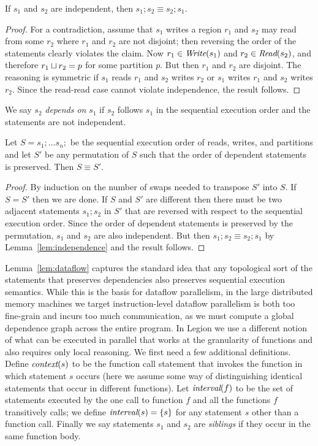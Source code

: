 \begin{lemma}
\rm
\label{lem:independence}
If $s_1$ and $s_2$ are independent, then $s_1; s_2 \equiv s_2; s_1$.
\end{lemma}
\begin{proof}
For a contradiction, assume that $s_1$ writes a region $r_1$ and $s_2$ may read from some $r_2$ where $r_1$ and $r_2$
are not disjoint; then reversing the order of the statements clearly violates the claim.  Now $r_1 \in \mbox{\em Write}(s_1)$
and $r_2 \in \mbox{\em Read}(s_2)$, and therefore $r_1 \sqcup r_2 = p$ for some partition $p$.  But then $r_1$ and $r_2$ are disjoint.
The reasoning is symmetric if $s_1$ reads $r_1$ and $s_2$ writes $r_2$ or $s_1$ writes $r_1$ and $s_2$ writes $r_2$.
Since the read-read case cannot violate independence, the result follows.
\end{proof}
We say $s_2$ {\em depends on} $s_1$ if $s_2$ follows $s_1$ in the sequential execution order and the statements are not independent.
\begin{lemma}
\rm
\label{lem:dataflow}
Let $S = s_1; \ldots s_n;$ be the sequential execution order of reads, writes, and partitions and let $S'$ be any permutation of $S$ such that the order of dependent statements is preserved.  Then $S \equiv S'$.
\end{lemma}
\begin{proof}
By induction on the number of swaps needed to transpose $S'$ into $S$.
If $S = S'$ then we are done.  If $S$ and $S'$ are different then
there must be two adjacent statements $s_1; s_2$ in $S'$ that are
reversed with respect to the sequential execution order.  Since the order of
dependent statements is preserved by the permutation, $s_1$ and $s_2$ are also independent.
But then $s_1; s_2 \equiv s_2; s_1$ by Lemma~\ref{lem:independence} and the result follows.
\end{proof}
Lemma~\ref{lem:dataflow} captures the standard idea that any
topological sort of the statements that preserves dependencies also
preserves sequential execution semantics.  While this is the basis for
dataflow parallelism, in the large distributed memory machines we
target instruction-level dataflow parallelism is both too fine-grain
and incurs too much communication, as we must compute a global
dependence graph across the entire program.  In Legion we use a
different notion of what can be executed in parallel that works at the
granularity of functions and also requires only local reasoning.  We
first need a few additional definitions.  Define $\mbox{\em context}(s)$ to be
the function call statement that invokes the function in which
statement $s$ occurs (here we assume some way of distinguishing
identical statements that occur in different functions).  Let
$\mbox{\em interval}(f)$ to be the set of statements executed by the one call to
function $f$ and all the functions $f$ transitively calls; we define
$\mbox{\em interval}(s) = \{ s \}$ for any statement $s$ other than a function call.
Finally we say statements $s_1$ and $s_2$ are {\em siblings} if they
occur in the same function body.

